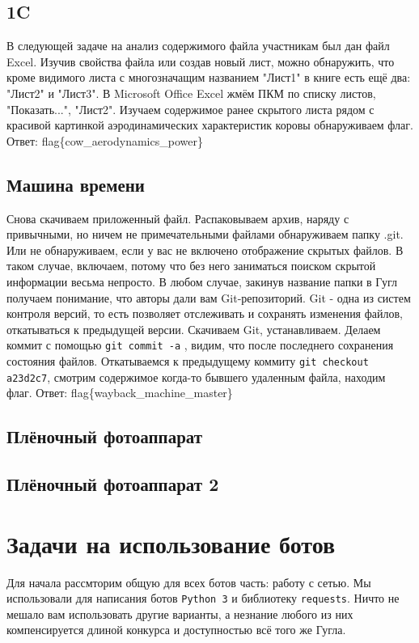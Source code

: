 \documentclass[12pt]{article}
\begin{document}
	\newpage
	\subsection{1C}
	В следующей задаче на анализ содержимого файла участникам был дан файл Excel. Изучив свойства файла или создав новый лист, можно обнаружить, что кроме видимого листа с многозначащим названием "Лист1" в книге есть ещё два: "Лист2" и "Лист3". В Microsoft Office Excel жмём ПКМ по списку листов, "Показать...", "Лист2". Изучаем содержимое ранее скрытого листа рядом с красивой картинкой аэродинамических характеристик коровы обнаруживаем флаг.
	\linebreak
	Ответ: flag\{cow\_aerodynamics\_power\}

	\newpage
	\subsection{Машина времени}
	Снова скачиваем приложенный файл. Распаковываем архив, наряду с привычными, но ничем не примечательными файлами обнаруживаем папку .git. Или не обнаруживаем, если у вас не включено отображение скрытых файлов. В таком случае, включаем, потому что без него заниматься поиском скрытой информации весьма непросто. В любом случае, закинув название папки в Гугл получаем понимание, что авторы дали вам Git-репозиторий. Git - одна из систем контроля версий, то есть позволяет отслеживать и сохранять изменения файлов, откатываться к предыдущей версии. Скачиваем Git, устанавливаем. Делаем коммит с помощью \verb|git commit -a| , видим, что после последнего сохранения состояния файлов. Откатываемся к предыдущему коммиту \verb|git checkout a23d2c7|, смотрим содержимое когда-то бывшего удаленным файла, находим флаг.
	\linebreak
	Ответ: flag\{wayback\_machine\_master\}

	\newpage
	\subsection{Плёночный фотоаппарат}

	\newpage
	\subsection{Плёночный фотоаппарат 2}

	
	\newpage
	\section{Задачи на использование ботов}
	Для начала рассмторим общую для всех ботов часть: работу с сетью. Мы использовали для написания ботов \verb|Python 3| и библиотеку \verb|requests|. Ничто не мешало вам использовать другие варианты, а незнание любого из них компенсируется длиной конкурса и доступностью всё того же Гугла.
\end{document}
